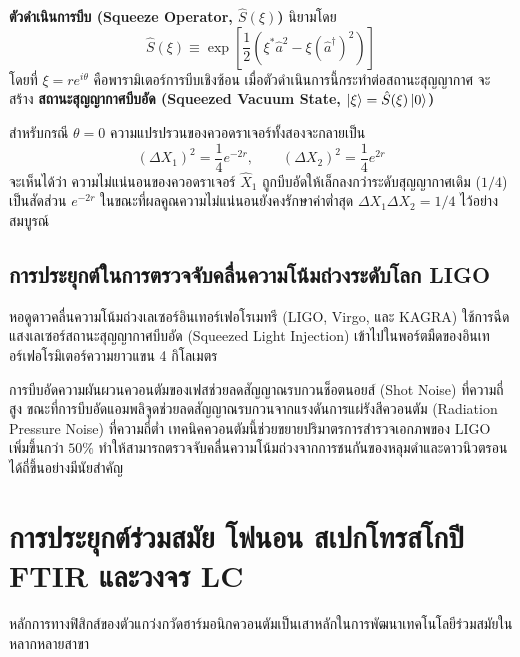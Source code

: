 \textbf{ตัวดำเนินการบีบ (Squeeze Operator, $\hat{S}(\xi)$)} นิยามโดย
\begin{equation}
\hat{S}(\xi) \equiv \exp\left[ \frac{1}{2}\left( \xi^* \hat{a}^2 - \xi (\hat{a}^\dagger)^2 \right) \right]
\end{equation}
โดยที่ $\xi = r e^{i\theta}$ คือพารามิเตอร์การบีบเชิงซ้อน เมื่อตัวดำเนินการนี้กระทำต่อสถานะสุญญากาศ จะสร้าง \textbf{สถานะสุญญากาศบีบอัด (Squeezed Vacuum State, $\ket{\xi} = \hat{S}(\xi)\ket{0}$)}

สำหรับกรณี $\theta = 0$ ความแปรปรวนของควอดราเจอร์ทั้งสองจะกลายเป็น
\begin{equation}
(\Delta X_1)^2 = \frac{1}{4}e^{-2r}, \qquad (\Delta X_2)^2 = \frac{1}{4}e^{2r}
\end{equation}
จะเห็นได้ว่า ความไม่แน่นอนของควอดราเจอร์ $\hat{X}_1$ ถูกบีบอัดให้เล็กลงกว่าระดับสุญญากาศเดิม ($1/4$) เป็นสัดส่วน $e^{-2r}$ ในขณะที่ผลคูณความไม่แน่นอนยังคงรักษาค่าต่ำสุด $\Delta X_1 \Delta X_2 = 1/4$ ไว้อย่างสมบูรณ์

\subsection{การประยุกต์ในการตรวจจับคลื่นความโน้มถ่วงระดับโลก LIGO}
หอดูดาวคลื่นความโน้มถ่วงเลเซอร์อินเทอร์เฟอโรเมทรี (LIGO, Virgo, และ KAGRA) ใช้การฉีดแสงเลเซอร์สถานะสุญญากาศบีบอัด (Squeezed Light Injection) เข้าไปในพอร์ตมืดของอินเทอร์เฟอโรมิเตอร์ความยาวแขน 4 กิโลเมตร

การบีบอัดความผันผวนควอนตัมของเฟสช่วยลดสัญญาณรบกวนช็อตนอยส์ (Shot Noise) ที่ความถี่สูง ขณะที่การบีบอัดแอมพลิจูดช่วยลดสัญญาณรบกวนจากแรงดันการแผ่รังสีควอนตัม (Radiation Pressure Noise) ที่ความถี่ต่ำ เทคนิคควอนตัมนี้ช่วยขยายปริมาตรการสำรวจเอกภพของ LIGO เพิ่มขึ้นกว่า $50\%$ ทำให้สามารถตรวจจับคลื่นความโน้มถ่วงจากการชนกันของหลุมดำและดาวนิวตรอนได้ถี่ขึ้นอย่างมีนัยสำคัญ

\section{การประยุกต์ร่วมสมัย โฟนอน สเปกโทรสโกปี FTIR และวงจร LC}
\label{sec_contemporary_applications}

หลักการทางฟิสิกส์ของตัวแกว่งกวัดฮาร์มอนิกควอนตัมเป็นเสาหลักในการพัฒนาเทคโนโลยีร่วมสมัยในหลากหลายสาขา

